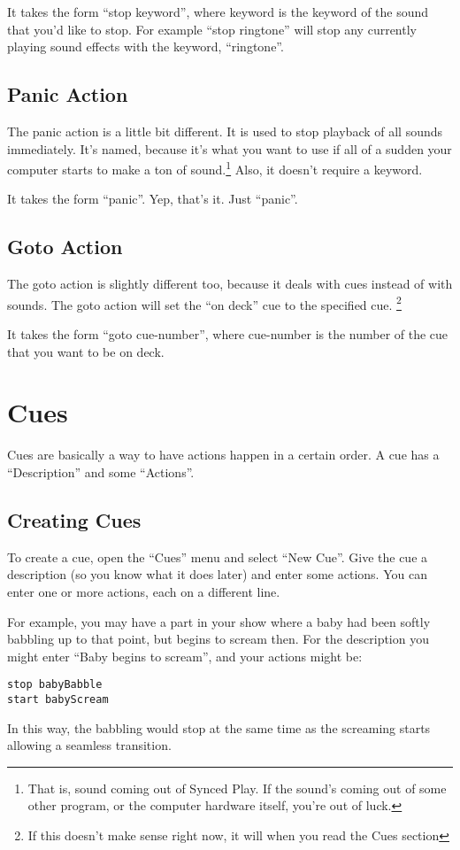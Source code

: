 \documentclass{article}
\begin{document}
It takes the form ``stop keyword'', where keyword is the keyword of the 
sound that you'd like to stop. For example ``stop ringtone'' will
stop any currently playing sound effects with the keyword, ``ringtone''.

\subsection{Panic Action}

The panic action is a little bit different. It is used to stop playback
of all sounds immediately. It's named, because it's what you want to use
if all of a sudden your computer starts to make a ton of sound.\footnote{
That is, sound coming out of Synced Play. If the sound's coming out of some
other program, or the computer hardware itself, you're out of luck.} Also,
it doesn't require a keyword.

It takes the form ``panic''. Yep, that's it. Just ``panic''.

\subsection{Goto Action}

The goto action is slightly different too, because it deals with cues
instead of with sounds. The goto action will set the ``on deck'' cue to
the specified cue. \footnote{If this doesn't make sense right now, it will
when you read the Cues section}

It takes the form ``goto cue-number'', where cue-number is the number of the
cue that you want to be on deck.

\newpage

\section{Cues}

Cues are basically a way to have actions happen in a certain order. A cue
has a ``Description'' and some ``Actions''. 

\subsection{Creating Cues}

To create a cue, open the ``Cues'' menu and select ``New Cue''. Give the cue
a description (so you know what it does later) and enter some actions. You
can enter one or more actions, each on a different line.

For example, you may have a part in your show where a baby had been softly
babbling up to that point, but begins to scream then. For the description
you might enter ``Baby begins to scream'', and your actions might be:
\begin{verbatim}
stop babyBabble
start babyScream
\end{verbatim}
In this way, the babbling would stop at the same time as the screaming
starts allowing a seamless transition.
\end{document}
